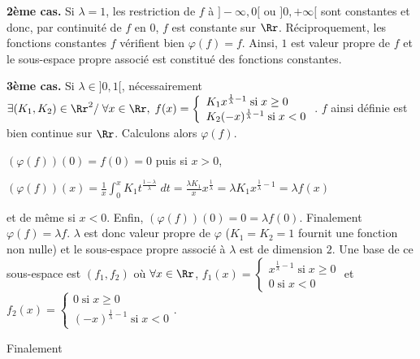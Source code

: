 {\begin{enumerate}
{\textbf{2ème cas.} Si $\lambda= 1$, les restriction de $f$ à $]-\infty,0[$ ou $]0,+\infty[$ sont constantes et donc, par continuité de $f$ en $0$, $f$ est constante sur $\Rr$. Réciproquement, les fonctions constantes $f$ vérifient bien $\varphi(f) = f$. Ainsi, $1$ est valeur propre de $f$ et le sous-espace propre associé est constitué des fonctions constantes.

\textbf{3ème cas.} Si $\lambda\in]0,1[$, nécessairement $\exists(K_1,K_2)\in\Rr^2/\;\forall x\in\Rr,\;f(x)=\left\{
\begin{array}{l}
K_1x^{\frac{1}{\lambda}-1}\;\text{si}\;x\geq0\\
K_2(-x)^{\frac{1}{\lambda}-1}\;\text{si}\;x < 0
\end{array}
\right.$. $f$ ainsi définie est bien continue sur $\Rr$. Calculons alors $\varphi(f)$.

 
$(\varphi(f))(0)=f(0)=0$ puis si $x > 0$,

\begin{center}
$(\varphi(f))(x)=\frac{1}{x}\int_{0}^{x}K_1t^{\frac{1-\lambda}{\lambda}}\;dt=\frac{\lambda K_1}{x}x^{\frac{1}{\lambda}}=\lambda K_1 x^{\frac{1}{\lambda}-1}=\lambda f(x)$
\end{center}

et de même si $x < 0$. Enfin, $(\varphi(f))(0)=0=\lambda f(0)$. Finalement $\varphi(f) =\lambda f$. $\lambda$ est donc valeur propre de $\varphi$ ($K_1 = K_2 = 1$ fournit une fonction non nulle) et le sous-espace propre associé à $\lambda$ est de dimension $2$. Une base de ce sous-espace est $(f_1,f_2)$ où $\forall x\in\Rr$, $f_1(x)=\left\{
\begin{array}{l}
x^{\frac{1}{\lambda}-1}\;\text{si}\;x\geq0\\
0\;\text{si}\;x < 0
\end{array}
\right.$ et $f_2(x) =\left\{
\begin{array}{l}
0\;\text{si}\;x\geq0\\
(-x)^{\frac{1}{\lambda}-1}\;\text{si}\;x < 0
\end{array}
\right.$.

Finalement

\begin{center}
\shadowbox{
$\text{Sp}(\varphi)= ]0,1]$.
}
\end{center}}
\end{enumerate}
}

